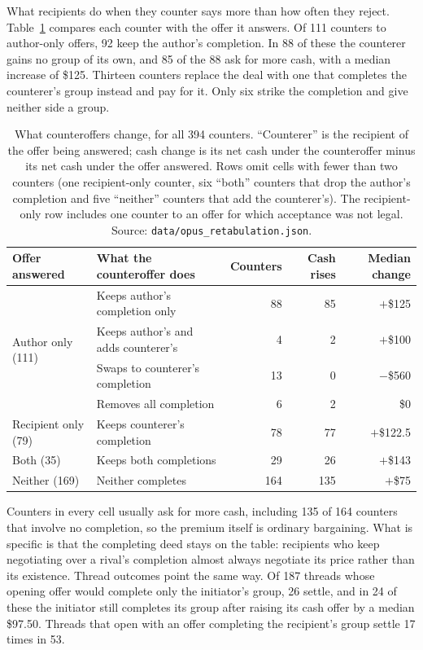 What recipients do when they counter says more than how often they reject. Table~\ref{tab:counters} compares each counter with the offer it answers. Of 111 counters to author-only offers, 92 keep the author's completion. In 88 of these the counterer gains no group of its own, and 85 of the 88 ask for more cash, with a median increase of \$125. Thirteen counters replace the deal with one that completes the counterer's group instead and pay for it. Only six strike the completion and give neither side a group.

\begin{table}[htbp]
\centering\small
\setlength{\tabcolsep}{4pt}
\begin{tabular}{@{}llrrr@{}}
\toprule
Offer answered & What the counteroffer does & Counters & Cash rises & Median change\\
\midrule
\multirow{4}{*}{Author only (111)} & Keeps author's completion only & 88 & 85 & $+$\$125\\
 & Keeps author's and adds counterer's & 4 & 2 & $+$\$100\\
 & Swaps to counterer's completion & 13 & 0 & $-$\$560\\
 & Removes all completion & 6 & 2 & \$0\\
\midrule
Recipient only (79) & Keeps counterer's completion & 78 & 77 & $+$\$122.5\\
Both (35) & Keeps both completions & 29 & 26 & $+$\$143\\
Neither (169) & Neither completes & 164 & 135 & $+$\$75\\
\bottomrule
\end{tabular}
\caption{What counteroffers change, for all 394 counters. ``Counterer'' is the recipient of the offer being answered; cash change is its net cash under the counteroffer minus its net cash under the offer answered. Rows omit cells with fewer than two counters (one recipient-only counter, six ``both'' counters that drop the author's completion and five ``neither'' counters that add the counterer's). The recipient-only row includes one counter to an offer for which acceptance was not legal. Source: \texttt{data/opus\_retabulation.json}.}
\label{tab:counters}
\end{table}

Counters in every cell usually ask for more cash, including 135 of 164 counters that involve no completion, so the premium itself is ordinary bargaining. What is specific is that the completing deed stays on the table: recipients who keep negotiating over a rival's completion almost always negotiate its price rather than its existence. Thread outcomes point the same way. Of 187 threads whose opening offer would complete only the initiator's group, 26 settle, and in 24 of these the initiator still completes its group after raising its cash offer by a median \$97.50. Threads that open with an offer completing the recipient's group settle 17 times in 53.

